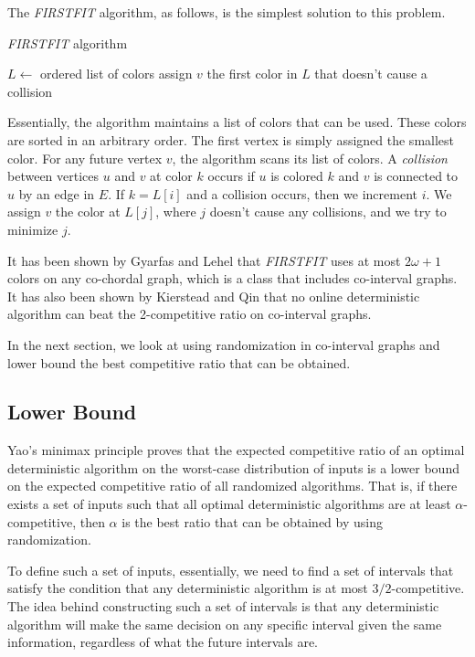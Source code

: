 The \emph{FIRSTFIT} algorithm, as follows, is the simplest solution to this problem.

\begin{algorithm}
\caption{\emph{FIRSTFIT} algorithm}
$L \leftarrow$ ordered list of colors\;
 {
  assign $v$ the first color in $L$ that doesn't cause a collision\;
}
\end{algorithm}

Essentially, the algorithm maintains a list of colors that can be used. These colors are sorted in an arbitrary order. The first vertex is simply assigned the smallest color. For any future vertex $v$, the algorithm scans its list of colors. A \emph{collision} between vertices $u$ and $v$ at color $k$ occurs if $u$ is colored $k$ and $v$ is connected to $u$ by an edge in $E$. If $k = L[i]$ and a collision occurs, then we increment $i$. We assign $v$ the color at $L[j]$, where $j$ doesn't cause any collisions, and we try to minimize $j$.

It has been shown by Gyarfas and Lehel \cite{gyarfas} that \emph{FIRSTFIT} uses at most $2\omega+1$ colors on any co-chordal graph, which is a class that includes co-interval graphs. It has also been shown by Kierstead and Qin \cite{kierstead} that no online deterministic algorithm can beat the 2-competitive ratio on co-interval graphs.

In the next section, we look at using randomization in co-interval graphs and lower bound the best competitive ratio that can be obtained.
\subsection{Lower Bound}
Yao's minimax principle proves that the expected competitive ratio of an optimal deterministic algorithm on the worst-case distribution of inputs is a lower bound on the expected competitive ratio of all randomized algorithms. That is, if there exists a set of inputs such that all optimal deterministic algorithms are at least $\alpha$-competitive, then $\alpha$ is the best ratio that can be obtained by using randomization.

To define such a set of inputs, essentially, we need to find a set of intervals that satisfy the condition that any deterministic algorithm is at most $3/2$-competitive. The idea behind constructing such a set of intervals is that any deterministic algorithm will make the same decision on any specific interval given the same information, regardless of what the future intervals are.


